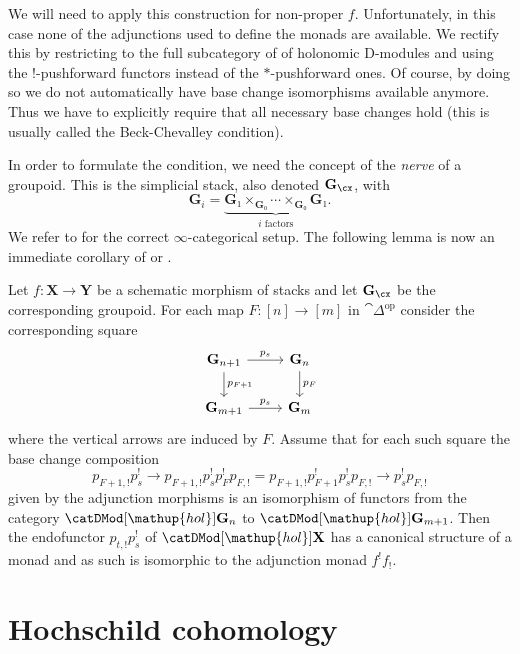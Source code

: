 \documentclass[english]{ck-article}
\let\stack\mathbf
\newcommand\catDModHol[1]{\catDMod[\mathup{hol}]{#1}}
\newcommand\ΓdR{Γ_{\mkern-4mu\dR}}
\newcommand\Γsub[1]{\Gamma_{\mkern-3mu#1}}
\newcommand{\RomanNum}[1]{\textsc{\MakeLowercase{#1}}}
\begin{document}
We will need to apply this construction for non-proper $f$.
Unfortunately, in this case none of the adjunctions used to define the monads are available.
We rectify this by restricting to the full subcategory of of holonomic D-modules and using the $!$-pushforward functors instead of the $*$-pushforward ones.
Of course, by doing so we do not automatically have base change isomorphisms available anymore.
Thus we have to explicitly require that all necessary base changes hold (this is usually called the Beck-Chevalley condition).

In order to formulate the condition, we need the concept of the \emph{nerve} of a groupoid.
This is the simplicial stack, also denoted $\stack{G}_\cx$, with
\[
    \stack G_i = \underbrace{\stack G₁ ×_{\stack G₀} \dotsb ×_{\stack G₀} \stack G₁}_{\text{$i$ factors}}.
\]
We refer to \cite[Section~6.1.2]{Lurie:2009:HigherToposTheory} for the correct $∞$-categorical setup.
The following lemma is now an immediate corollary of \cite[Lemma~\RomanNum{II}.1.7.1.4]{GaitsgoryRozenblyum:prelim:StudyInDAG} or \cite[Theorem~4.7.6.2]{Lurie:2014-draft:HigherAlgebra}.

\begin{Lem}
    \label{lem:pre:groupoid_monad_hol}%
    Let $f\colon \stack X → \stack Y$ be a schematic morphism of stacks and let $\stack G_\cx$ be the corresponding groupoid.
    For each map $F\colon [n] → [m]$ in $\cat{Δ}^{\mathrm{op}}$ consider the corresponding square
    \[
        \begin{tikzcd}
            \stack G_{n+1} \arrow[r, "p_s"] \arrow[d, "p_{F+1}"] & \stack G_n \arrow[d, "p_F"] \\
            \stack G_{m+1} \arrow[r, "p_s"] & \stack G_m
        \end{tikzcd}
    \]
    where the vertical arrows are induced by $F$.
    Assume that for each such square the base change composition
    \[
        p_{F+1,!} p_s^! →
        p_{F+1,!} p_s^! p_F^! p_{F,!} =
        p_{F+1,!} p_{F+1}^! p_s^!  p_{F,!} →
        p_s^! p_{F,!}
    \]
    given by the adjunction morphisms is an isomorphism of functors from the category $\catDModHol{\stack G_n}$ to $\catDModHol{\stack G_{m+1}}$.
    Then the endofunctor $p_{t,!} p_s^!$ of $\catDModHol{\stack X}$ has a canonical structure of a monad and as such is isomorphic to the adjunction monad $f^!f_!$.
\end{Lem}

\section{Hochschild cohomology}
\end{document}
